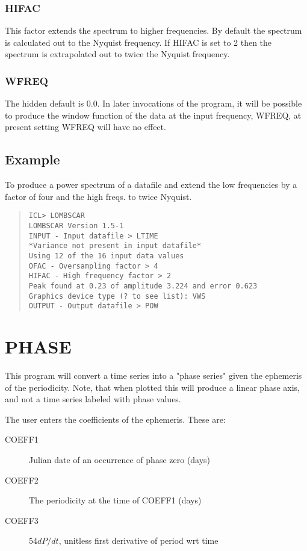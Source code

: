 \documentclass{book}
\renewcommand{\_}{{\tt\char'137}}     %
\begin{document}
\subsubsection{HIFAC}
This factor extends the spectrum to higher frequencies. By default
the spectrum is calculated out to the Nyquist frequency. If HIFAC
is set to 2 then the spectrum is extrapolated out to twice the
Nyquist frequency.

\subsubsection{WFREQ}
The hidden default is 0.0. In later invocations of the program,
it will be possible to produce the window function of the data at
the input frequency, WFREQ, at present setting WFREQ will have
no effect.

\subsection{Example}
To produce a power spectrum of a datafile and extend the low frequencies
by a factor of four and the high freqs. to twice Nyquist.
\begin{quote}\begin{verbatim}
ICL> LOMBSCAR
LOMBSCAR Version 1.5-1
INPUT - Input datafile > LTIME
*Variance not present in input datafile*
Using 12 of the 16 input data values
OFAC - Oversampling factor > 4
HIFAC - High frequency factor > 2
Peak found at 0.23 of amplitude 3.224 and error 0.623
Graphics device type (? to see list): VWS
OUTPUT - Output datafile > POW
\end{verbatim}\end{quote}
\section{PHASE}
This program will convert a time series into a "phase series"
given the ephemeris of the periodicity. Note, that when plotted
this will produce a linear phase axis, and not a time series
labeled with phase values.

The user enters the coefficients of the ephemeris. These are:


\begin{description}
\item[COEFF1]
Julian date of an occurrence of phase zero (days)
\item[COEFF2]
The periodicity at the time of COEFF1 (days)
\item[COEFF3]
54$dP/dt$, unitless first derivative of period wrt time
\end{description}
\end{document}
